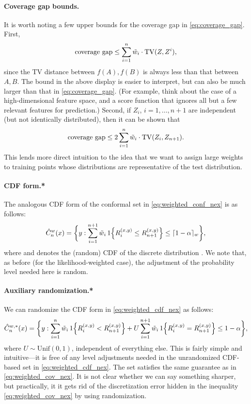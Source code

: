 \documentclass{article}
\begin{document}
\paragraph{Coverage gap bounds.}

It is worth noting a few upper bounds for the coverage gap in
\eqref{eq:coverage_gap}. First, 
\[
\text{coverage gap} \leq \sum_{i=1}^n \tilde{w}_i \cdot \mathrm{TV}(Z, Z^i),
\]
since the TV distance between $f(A),f(B)$ is always less than that between
$A,B$. The bound in the above display is easier to interpret, but can also be
much larger than that in \eqref{eq:coverage_gap}. (For example, think about the
case of a high-dimensional feature space, and a score function that ignores all
but a few relevant features for prediction.) Second, if $Z_i$, $i=1,\dots,n+1$
are independent (but not identically distributed), then it can be shown that 
\[
\text{coverage gap} \leq 2\sum_{i=1}^n \tilde{w}_i \cdot \mathrm{TV}(Z_i, Z_{n+1}).
\]
This lends more direct intuition to the idea that we want to assign large
weights to training points whose distributions are representative of the test 
distribution. 

\paragraph{CDF form.*}

The analogous CDF form of the conformal set in \eqref{eq:weighted_conf_nex} is
as follows: 
\begin{equation}
\label{eq:weighted_cdf_nex}
\hat{C}^w_n(x) = \bigg\{ y : \sum_{i=1}^{n+1} \tilde{w}_i \, 1\Big\{ R_i^{(x,y)} \leq
R^{(x,y)}_{n+1} \Big\} \leq \lceil 1-\alpha \rceil_w \bigg\},
\end{equation}
where  and  denotes the (random) CDF of the
discrete distribution . We note that, as before (for the
likelihood-weighted case), the adjustment of the probability level needed here
is random.  

\paragraph{Auxiliary randomization.*}

We can randomize the CDF form in \eqref{eq:weighted_cdf_nex} as follows: 
\[
\hat{C}_n^{w,*}(x) = \bigg\{ y : \sum_{i=1}^n \tilde{w}_i \, 1\Big\{ R_i^{(x,y)} <
R^{(x,y)}_{n+1} \Big\} + U \sum_{i=1}^{n+1} \tilde{w}_i \, 1\Big\{ R_i^{(x,y)} =
R^{(x,y)}_{n+1} \Big\} \leq 1-\alpha \bigg\},
\]
where $U \sim \mathrm{Unif}(0,1)$, independent of everything else. This is
fairly simple and intuitive---it is free of any level adjustments needed in the   
unrandomized CDF-based set in \eqref{eq:weighted_cdf_nex}. The set
 satisfies the same guarantee as in
\eqref{eq:weighted_cov_nex}. It is not clear whether we can say something
sharper, but practically, it it gets rid of the discretization error hidden in 
the inequality \eqref{eq:weighted_cov_nex} by using randomization. 
\end{document}
